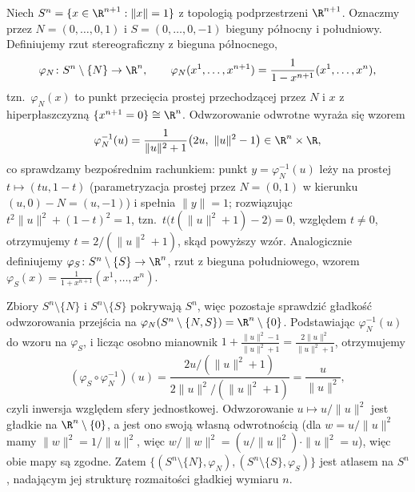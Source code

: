 \begin{przyklad}\label{prz:sfera}
Niech $S^n=\{x\in\R^{n+1}:\|x\|=1\}$ z topologią podprzestrzeni $\R^{n+1}$. Oznaczmy przez
$N=(0,\dots,0,1)$ i $S=(0,\dots,0,-1)$ bieguny północny i południowy. Definiujemy rzut
stereograficzny z bieguna północnego,
\[
\varphi_N\colon S^n\setminus\{N\}\to\R^n, \qquad
\varphi_N(x^1,\dots,x^{n+1})=\frac{1}{1-x^{n+1}}(x^1,\dots,x^n),
\]
tzn.\ $\varphi_N(x)$ to punkt przecięcia prostej przechodzącej przez $N$ i $x$ z
hiperpłaszczyzną $\{x^{n+1}=0\}\cong\R^n$. Odwzorowanie odwrotne wyraża się wzorem
\[
\varphi_N^{-1}(u)=\frac1{\|u\|^2+1}\big(2u,\ \|u\|^2-1\big)\in\R^n\times\R,
\]
co sprawdzamy bezpośrednim rachunkiem: punkt $y=\varphi_N^{-1}(u)$ leży na prostej
$t\mapsto(tu,1-t)$ (parametryzacja prostej przez $N=(0,1)$ w kierunku $(u,0)-N=(u,-1)$) i
spełnia $\|y\|=1$; rozwiązując $t^2\|u\|^2+(1-t)^2=1$, tzn.\ $t\big(t(\|u\|^2+1)-2\big)=0$,
względem $t\neq0$, otrzymujemy $t=2/(\|u\|^2+1)$, skąd powyższy wzór. Analogicznie
definiujemy $\varphi_S\colon S^n\setminus\{S\}\to\R^n$, rzut z bieguna południowego, wzorem
$\varphi_S(x)=\frac1{1+x^{n+1}}(x^1,\dots,x^n)$.

Zbiory $S^n\setminus\{N\}$ i $S^n\setminus\{S\}$ pokrywają $S^n$, więc pozostaje sprawdzić
gładkość odwzorowania przejścia na $\varphi_N(S^n\setminus\{N,S\})=\R^n\setminus\{0\}$.
Podstawiając $\varphi_N^{-1}(u)$ do wzoru na $\varphi_S$, i licząc osobno mianownik
$1+\frac{\|u\|^2-1}{\|u\|^2+1}=\frac{2\|u\|^2}{\|u\|^2+1}$,
otrzymujemy
\[
(\varphi_S\circ\varphi_N^{-1})(u)=\frac{2u/(\|u\|^2+1)}{2\|u\|^2/(\|u\|^2+1)}=
\frac{u}{\|u\|^2},
\]
czyli inwersja względem sfery jednostkowej. Odwzorowanie $u\mapsto u/\|u\|^2$ jest gładkie
na $\R^n\setminus\{0\}$, a jest ono swoją własną odwrotnością (dla $w=u/\|u\|^2$ mamy
$\|w\|^2=1/\|u\|^2$, więc $w/\|w\|^2=(u/\|u\|^2)\cdot\|u\|^2=u$), więc obie mapy są
zgodne. Zatem $\{(S^n\setminus\{N\},\varphi_N),(S^n\setminus\{S\},\varphi_S)\}$ jest
atlasem na $S^n$, nadającym jej strukturę rozmaitości gładkiej wymiaru $n$.
\end{przyklad}

